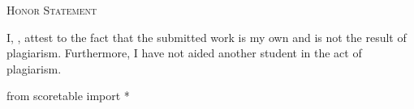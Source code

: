 

\renewcommand\AUTHOR{jdoe5@cougars.ccis.edu} %


\topmattertwo



\begin{center}
  \textsc{Honor Statement}
\end{center}
I, ,
attest to the fact that the submitted work is my own and
is not the result of plagiarism.
Furthermore, I have not aided another student in the act of
plagiarism.

\begin{python}
from scoretable import *
\end{python}

\newpage


